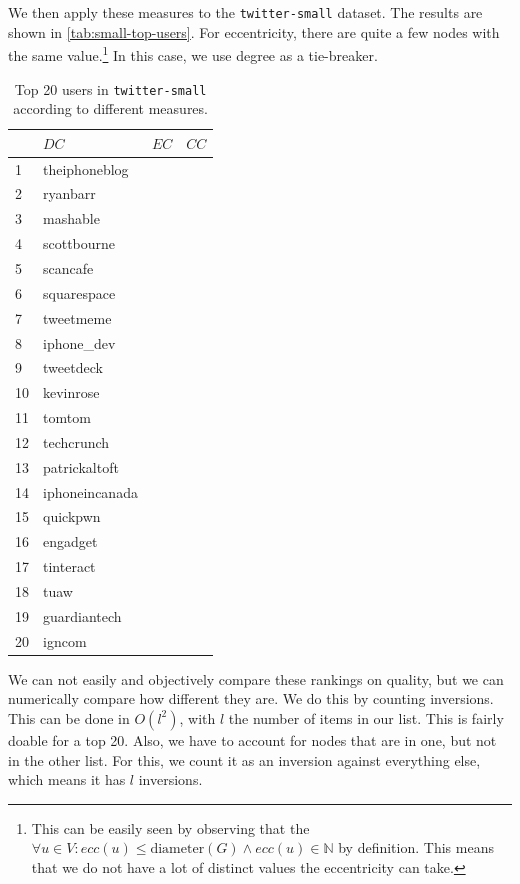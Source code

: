 \documentclass[a4paper,10pt,hidelinks]{article}
\begin{document}
We then apply these measures to the \texttt{twitter-small} dataset. The results are shown in \autoref{tab:small-top-users}. For eccentricity, there are quite a few nodes with the same value.\footnote{This can be easily seen by observing that the $\forall u \in V: ecc(u) \leq \text{diameter}(G) \land ecc(u) \in \mathbb{N}$ by definition. This means that we do not have a lot of distinct values the eccentricity can take.} In this case, we use degree as a tie-breaker.

\begin{table}
	\centering
	\begin{tabular}{l || l | l | l}
		& $DC$ & $EC$ & $CC$ \\
		\hline
		1 & theiphoneblog \\
		2 & ryanbarr \\
		3 & mashable \\
		4 & scottbourne \\
		5 & scancafe \\
		6 & squarespace \\
		7 & tweetmeme \\
		8 & iphone\_dev \\
		9 & tweetdeck \\
		10 & kevinrose \\
		11 & tomtom \\
		12 & techcrunch \\
		13 & patrickaltoft \\
		14 & iphoneincanada \\
		15 & quickpwn \\
		16 & engadget \\
		17 & tinteract \\
		18 & tuaw \\
		19 & guardiantech \\
		20 & igncom
	\end{tabular}
	\caption{Top 20 users in \texttt{twitter-small} according to different measures.}
	\label{tab:small-top-users}
\end{table}

We can not easily and objectively compare these rankings on quality, but we can numerically compare how different they are. We do this by counting inversions. This can be done in $O(l^2)$, with $l$ the number of items in our list. This is fairly doable for a top 20. Also, we have to account for nodes that are in one, but not in the other list. For this, we count it as an inversion against everything else, which means it has $l$ inversions.
\end{document}
